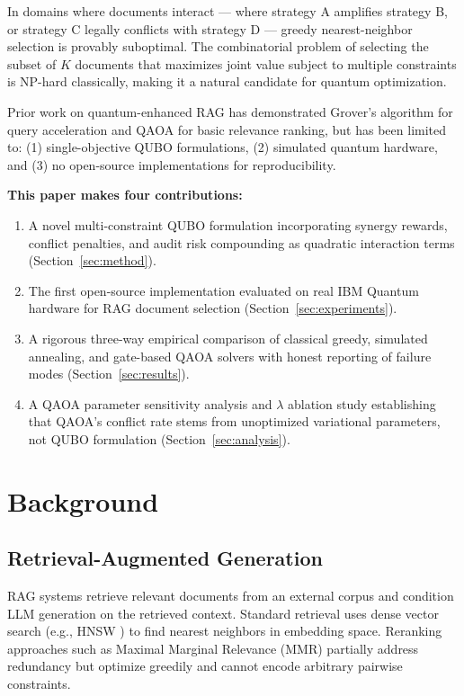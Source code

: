 \documentclass{article}
\begin{document}
In domains where documents interact — where strategy A amplifies
strategy B, or strategy C legally conflicts with strategy D — greedy
nearest-neighbor selection is provably suboptimal. The combinatorial
problem of selecting the subset of $K$ documents that maximizes joint
value subject to multiple constraints is NP-hard classically, making it
a natural candidate for quantum optimization.

Prior work on quantum-enhanced RAG \cite{qrag2025} has demonstrated
Grover's algorithm for query acceleration and QAOA for basic relevance
ranking, but has been limited to: (1) single-objective QUBO
formulations, (2) simulated quantum hardware, and (3) no open-source
implementations for reproducibility.

\textbf{This paper makes four contributions:}
\begin{enumerate}
    \item A novel multi-constraint QUBO formulation incorporating
    synergy rewards, conflict penalties, and audit risk compounding as
    quadratic interaction terms (Section~\ref{sec:method}).
    \item The first open-source implementation evaluated on real IBM
    Quantum hardware for RAG document selection (Section~\ref{sec:experiments}).
    \item A rigorous three-way empirical comparison of classical greedy,
    simulated annealing, and gate-based QAOA solvers with honest
    reporting of failure modes (Section~\ref{sec:results}).
    \item A QAOA parameter sensitivity analysis and $\lambda$ ablation
    study establishing that QAOA's conflict rate stems from
    unoptimized variational parameters, not QUBO formulation
    (Section~\ref{sec:analysis}).
\end{enumerate}

\section{Background}
\label{sec:background}

\subsection{Retrieval-Augmented Generation}

RAG systems \cite{lewis2020rag} retrieve relevant documents from an
external corpus and condition LLM generation on the retrieved context.
Standard retrieval uses dense vector search (e.g., HNSW \cite{hnsw})
to find nearest neighbors in embedding space. Reranking approaches such
as Maximal Marginal Relevance (MMR) \cite{carbonell1998mmr} partially
address redundancy but optimize greedily and cannot encode arbitrary
pairwise constraints.
\end{document}
